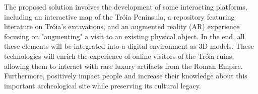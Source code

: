  The proposed solution involves the development of some interacting platforms, including an interactive map of the Tróia Peninsula, a repository featuring literature on Tróia's excavations, 
 and an augmented reality (AR) experience focusing on "augmenting" a visit to an existing physical object. 
 In the end, all these elements will be integrated into a digital environment as 3D models. 
 These technologies will enrich the experience of online visitors of the Tróia ruins, allowing them to interact with rare luxury artifacts from the Roman Empire. 
 Furthermore, positively impact people and increase their knowledge about this important archeological site while preserving its cultural legacy.


